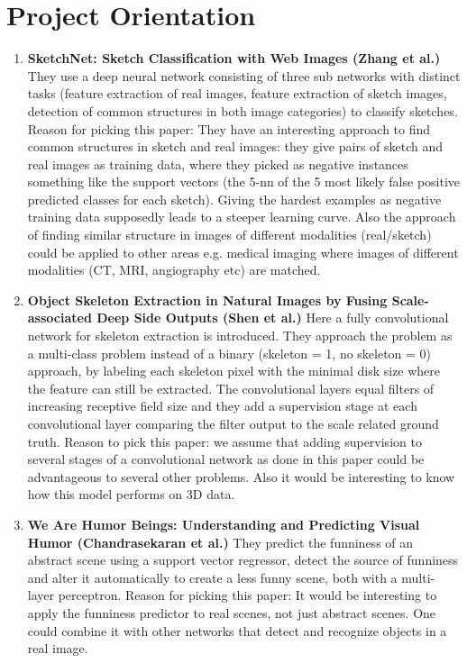 \documentclass{article}
\begin{document}
\section{Project Orientation}
\begin{enumerate}
\item \textbf{SketchNet: Sketch Classification with Web Images (Zhang et al.)} They use a deep neural network consisting of three sub networks with distinct tasks (feature extraction of real images, feature extraction of sketch images, detection of common structures in both image categories)  to classify sketches. Reason for picking this paper: They have an interesting approach to find common structures in sketch and real images: they give pairs of sketch and real images as training data, where they picked as negative instances something like the support vectors (the 5-nn of the 5 most likely false positive predicted classes for each sketch). Giving the hardest examples as negative training data supposedly leads to a steeper learning curve. Also the approach of finding similar structure in images of different modalities (real/sketch) could be applied to other areas e.g. medical imaging where images of different modalities (CT, MRI, angiography etc) are matched.
\item \textbf{Object Skeleton Extraction in Natural Images by Fusing Scale-associated Deep
Side Outputs (Shen et al.)} Here a fully convolutional network for skeleton extraction is introduced. They approach the problem as a multi-class problem instead of a binary (skeleton = 1, no skeleton = 0) approach, by labeling each skeleton pixel with the minimal disk size where the feature can still be extracted. The convolutional layers equal filters of increasing receptive field size and they add a supervision stage at each convolutional layer comparing the filter output to the scale related ground truth. Reason to pick this paper: we assume that adding supervision to several stages of a convolutional network as done in this paper could be advantageous to several other problems. Also it would be interesting to know how this model performs on 3D data.
\item \textbf{We Are Humor Beings: Understanding and Predicting Visual Humor (Chandrasekaran et al.)} They predict the funniness of an abstract scene using a support vector regressor, detect the source of funniness and alter it automatically to create a less funny scene, both with a multi-layer perceptron. Reason for picking this paper: It would be interesting to apply the funniness predictor to real scenes, not just abstract scenes. One could combine it with other networks that detect and recognize objects in a real image.
\end{enumerate}
\end{document}
